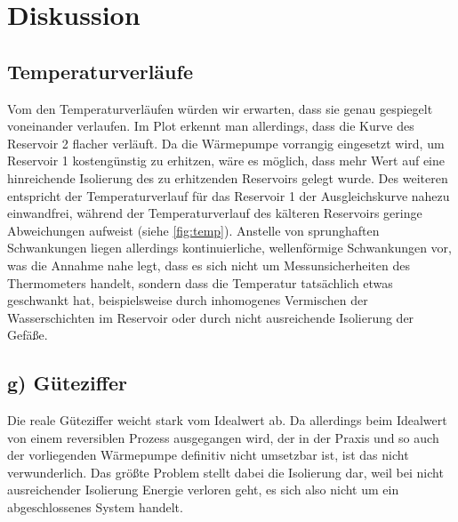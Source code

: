 \section{Diskussion}
\label{sec:Diskussion}

\subsection{Temperaturverläufe}
Vom den Temperaturverläufen würden wir erwarten, dass sie genau
gespiegelt voneinander verlaufen. Im Plot erkennt man allerdings,
dass die Kurve des Reservoir 2 flacher verläuft. Da die Wärmepumpe 
vorrangig eingesetzt wird, um Reservoir 1 kostengünstig zu erhitzen,
wäre es möglich, dass mehr Wert auf eine hinreichende Isolierung des 
zu erhitzenden Reservoirs gelegt wurde. Des weiteren
entspricht der Temperaturverlauf für das Reservoir 1 der Ausgleichskurve
nahezu einwandfrei, während der Temperaturverlauf des kälteren Reservoirs
geringe Abweichungen aufweist (siehe \ref{fig:temp}).
Anstelle von sprunghaften Schwankungen liegen allerdings kontinuierliche,
wellenförmige Schwankungen vor, was die Annahme nahe legt, dass 
es sich nicht um Messunsicherheiten des Thermometers handelt, sondern
dass die Temperatur tatsächlich etwas geschwankt hat, beispielsweise
durch inhomogenes Vermischen der Wasserschichten im Reservoir oder durch
nicht ausreichende Isolierung der Gefäße.\\
\subsection{g) Güteziffer}
Die reale Güteziffer weicht stark vom Idealwert ab. Da allerdings beim 
Idealwert von einem reversiblen Prozess ausgegangen wird, der in der 
Praxis und so auch der vorliegenden Wärmepumpe definitiv nicht umsetzbar
ist, ist das nicht verwunderlich. Das größte Problem stellt dabei die 
Isolierung dar, weil bei nicht ausreichender Isolierung Energie verloren 
geht, es sich also nicht um ein abgeschlossenes System handelt.
